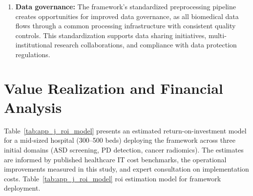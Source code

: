 \begin{enumerate}
    \item \textbf{Data governance:} The framework's standardized preprocessing pipeline creates opportunities for improved data governance, as all biomedical data flows through a common processing infrastructure with consistent quality controls. This standardization supports data sharing initiatives, multi-institutional research collaborations, and compliance with data protection regulations.
\end{enumerate}

\section{Value Realization and Financial Analysis}
\label{app_j:roi}

Table~\ref{tab:app_j_roi_model} presents an estimated return-on-investment model for a mid-sized hospital (300--500 beds) deploying the framework across three initial domains (ASD screening, PD detection, cancer radiomics). The estimates are informed by published healthcare IT cost benchmarks, the operational improvements measured in this study, and expert consultation on implementation costs.
\noindent Table~\ref{tab:app_j_roi_model} roi estimation model for framework deployment.

